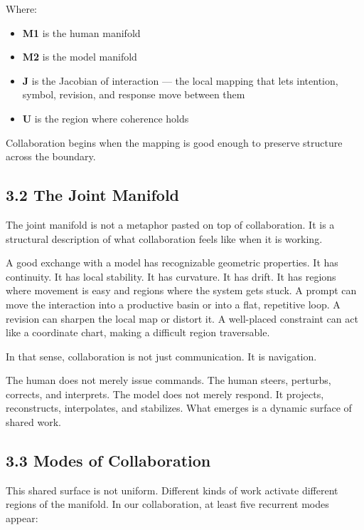 \documentclass[
]{article}
\providecommand{\tightlist}{%
  \setlength{\itemsep}{0pt}\setlength{\parskip}{0pt}}
\begin{document}
Where:

\begin{itemize}
\tightlist
\item
  \textbf{M1} is the human manifold
\item
  \textbf{M2} is the model manifold
\item
  \textbf{J} is the Jacobian of interaction --- the local mapping that
  lets intention, symbol, revision, and response move between them
\item
  \textbf{U} is the region where coherence holds
\end{itemize}

Collaboration begins when the mapping is good enough to preserve
structure across the boundary.

\hypertarget{the-joint-manifold}{%
\subsection{3.2 The Joint Manifold}\label{the-joint-manifold}}

The joint manifold is not a metaphor pasted on top of collaboration. It
is a structural description of what collaboration feels like when it is
working.

A good exchange with a model has recognizable geometric properties. It
has continuity. It has local stability. It has curvature. It has drift.
It has regions where movement is easy and regions where the system gets
stuck. A prompt can move the interaction into a productive basin or into
a flat, repetitive loop. A revision can sharpen the local map or distort
it. A well-placed constraint can act like a coordinate chart, making a
difficult region traversable.

In that sense, collaboration is not just communication. It is
navigation.

The human does not merely issue commands. The human steers, perturbs,
corrects, and interprets. The model does not merely respond. It
projects, reconstructs, interpolates, and stabilizes. What emerges is a
dynamic surface of shared work.

\hypertarget{modes-of-collaboration}{%
\subsection{3.3 Modes of Collaboration}\label{modes-of-collaboration}}

This shared surface is not uniform. Different kinds of work activate
different regions of the manifold. In our collaboration, at least five
recurrent modes appear:
\end{document}
